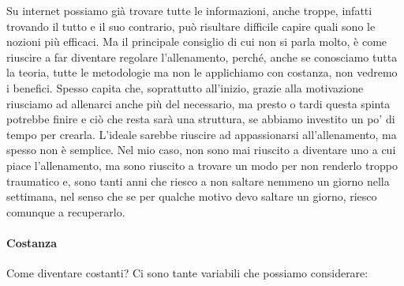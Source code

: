 \documentclass[12pt]{book} %
\begin{document}
Su internet possiamo già trovare tutte le informazioni, anche troppe, infatti trovando il tutto e il suo contrario, può risultare difficile capire quali sono le nozioni più efficaci. Ma il principale consiglio di cui non si parla molto, è come riuscire a far diventare regolare l'allenamento, perché, anche se conosciamo tutta la teoria, tutte le metodologie ma non le applichiamo con costanza, non vedremo i benefici. Spesso capita che, soprattutto all'inizio, grazie alla motivazione riusciamo ad allenarci anche più del necessario, ma presto o tardi questa spinta potrebbe finire e ciò che resta sarà una struttura, se abbiamo investito un po' di tempo per crearla. L'ideale sarebbe riuscire ad appassionarsi all'allenamento, ma spesso non è semplice. Nel mio caso, non sono mai riuscito a diventare uno a cui piace l'allenamento, ma sono riuscito a trovare un modo per non renderlo troppo traumatico e, sono tanti anni che riesco a non saltare nemmeno un giorno nella settimana, nel senso che se per qualche motivo devo saltare un giorno, riesco comunque a recuperarlo.

\paragraph{Costanza}

Come diventare costanti?
Ci sono tante variabili che possiamo considerare:
\end{document}
